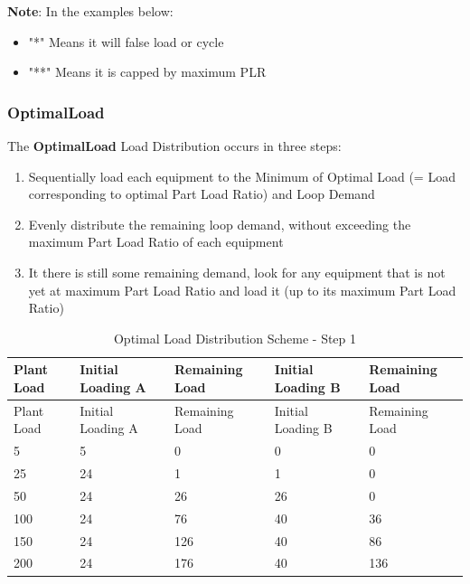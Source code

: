\textbf{Note}: In the examples below:

\begin{itemize}
\item
    "*" Means it will false load or cycle
\item
    "**" Means it is capped by maximum PLR
\end{itemize}


\subsubsection{OptimalLoad}%
\label{ssub:optimalload}

The \textbf{OptimalLoad} Load Distribution occurs in three steps:

\begin{enumerate}
    \def\labelenumi{Step \arabic{enumi}:}
\item
    Sequentially load each equipment to the Minimum of Optimal Load (= Load corresponding to optimal Part Load Ratio) and Loop Demand
\item
    Evenly distribute the remaining loop demand, without exceeding the maximum Part Load Ratio of each equipment
\item
    It there is still some remaining demand, look for any equipment that is not yet at maximum Part Load Ratio and load it (up to its maximum Part Load Ratio)
\end{enumerate}

\begin{longtable}[c]{|l|l|l|l|l|}
    \caption{Optimal Load Distribution Scheme - Step 1}
    \label{tab:optimal-load-step-1}\\

\hline
Plant Load & Initial Loading A & Remaining Load & Initial Loading B & Remaining Load \\ \hline
\endfirsthead

\hline
Plant Load & Initial Loading A & Remaining Load & Initial Loading B & Remaining Load \\ \hline
\endhead

5 & 5 & 0 & 0 & 0 \\ \hline
25 & 24 & 1 & 1 & 0 \\ \hline
50 & 24 & 26 & 26 & 0 \\ \hline
100 & 24 & 76 & 40 & 36 \\ \hline
150 & 24 & 126 & 40 & 86 \\ \hline
200 & 24 & 176 & 40 & 136 \\ \hline
\end{longtable}

